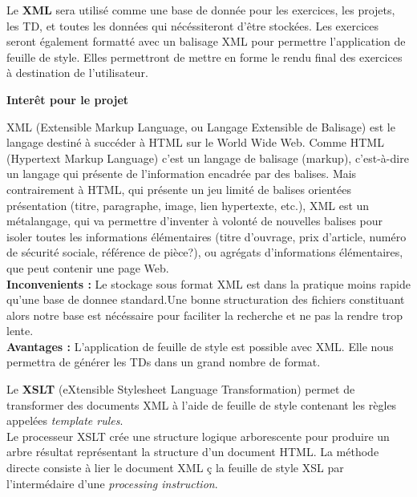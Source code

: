 \par Le {\bf XML} sera utilis{\'e} comme une base de donn{\'e}e pour les exercices, 
les projets, les TD, et toutes les donn{\'e}es qui n{\'e}c{\'e}ssiteront d'{\^e}tre stock{\'e}es.
Les exercices seront {\'e}galement formatt{\'e} avec un balisage XML pour permettre
l'application de feuille de style. Elles permettront de mettre en forme le 
rendu final des exercices {\`a} destination de l'utilisateur.

{\bf Inter{\^e}t pour le projet}

XML (Extensible Markup Language, ou Langage Extensible de Balisage) 
est le langage destin{\'e} {\`a} succ{\'e}der {\`a} HTML sur le World Wide Web. 
Comme HTML (Hypertext Markup Language) c'est un langage de balisage (markup), 
c'est-{\`a}-dire un langage qui pr{\'e}sente de l'information encadr{\'e}e par des balises. 
Mais contrairement {\`a} HTML, qui pr{\'e}sente un jeu limit{\'e} de balises orient{\'e}es pr{\'e}sentation 
(titre, paragraphe, image, lien hypertexte, etc.), 
XML est un m{\'e}talangage, qui va permettre d'inventer {\`a} volont{\'e} de nouvelles balises 
pour isoler toutes les informations {\'e}l{\'e}mentaires (titre d'ouvrage, prix d'article, 
num{\'e}ro de s{\'e}curit{\'e} sociale, r{\'e}f{\'e}rence de pi{\`e}ce?), ou agr{\'e}gats d'informations {\'e}l{\'e}mentaires, 
que peut contenir une page Web. \\

{\bf Inconvenients :} Le stockage sous format XML est dans la pratique
moins rapide qu'une base de donnee standard.Une bonne structuration
des fichiers constituant alors notre base est n{\'e}c{\'e}ssaire pour
faciliter la recherche et ne pas la rendre trop lente.\\

{\bf Avantages :} L'application de feuille de style est possible avec XML. 
Elle nous permettra de g{\'e}n{\'e}rer les TDs dans un grand nombre de format.\\

\par Le {\bf XSLT} (eXtensible Stylesheet Language Transformation) permet de
transformer des documents XML {\`a} l'aide de feuille de style contenant
les r{\`e}gles appel{\'e}es {\it template rules}.\\
Le processeur XSLT cr{\'e}e une structure logique arborescente pour
produire un arbre r{\'e}sultat repr{\'e}sentant la structure d'un document
HTML. La m{\'e}thode directe consiste {\`a} lier le document XML {\c c} la feuille
de style XSL par l'interm{\'e}daire d'une {\it processing instruction}.\\

